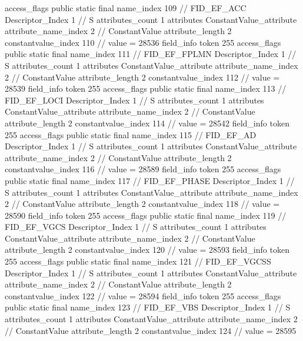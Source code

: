 {{{{{				access_flags	public static final
				name_index	109		// FID_EF_ACC
				Descriptor_Index	1		// S
				attributes_count	1
				attributes {
				ConstantValue_attribute {
					attribute_name_index	2		// ConstantValue
					attribute_length	2
					constantvalue_index	110		// value = 28536
				}
				}
			}
			field_info {
				token	255
				access_flags	public static final
				name_index	111		// FID_EF_FPLMN
				Descriptor_Index	1		// S
				attributes_count	1
				attributes {
				ConstantValue_attribute {
					attribute_name_index	2		// ConstantValue
					attribute_length	2
					constantvalue_index	112		// value = 28539
				}
				}
			}
			field_info {
				token	255
				access_flags	public static final
				name_index	113		// FID_EF_LOCI
				Descriptor_Index	1		// S
				attributes_count	1
				attributes {
				ConstantValue_attribute {
					attribute_name_index	2		// ConstantValue
					attribute_length	2
					constantvalue_index	114		// value = 28542
				}
				}
			}
			field_info {
				token	255
				access_flags	public static final
				name_index	115		// FID_EF_AD
				Descriptor_Index	1		// S
				attributes_count	1
				attributes {
				ConstantValue_attribute {
					attribute_name_index	2		// ConstantValue
					attribute_length	2
					constantvalue_index	116		// value = 28589
				}
				}
			}
			field_info {
				token	255
				access_flags	public static final
				name_index	117		// FID_EF_PHASE
				Descriptor_Index	1		// S
				attributes_count	1
				attributes {
				ConstantValue_attribute {
					attribute_name_index	2		// ConstantValue
					attribute_length	2
					constantvalue_index	118		// value = 28590
				}
				}
			}
			field_info {
				token	255
				access_flags	public static final
				name_index	119		// FID_EF_VGCS
				Descriptor_Index	1		// S
				attributes_count	1
				attributes {
				ConstantValue_attribute {
					attribute_name_index	2		// ConstantValue
					attribute_length	2
					constantvalue_index	120		// value = 28593
				}
				}
			}
			field_info {
				token	255
				access_flags	public static final
				name_index	121		// FID_EF_VGCSS
				Descriptor_Index	1		// S
				attributes_count	1
				attributes {
				ConstantValue_attribute {
					attribute_name_index	2		// ConstantValue
					attribute_length	2
					constantvalue_index	122		// value = 28594
				}
				}
			}
			field_info {
				token	255
				access_flags	public static final
				name_index	123		// FID_EF_VBS
				Descriptor_Index	1		// S
				attributes_count	1
				attributes {
				ConstantValue_attribute {
					attribute_name_index	2		// ConstantValue
					attribute_length	2
					constantvalue_index	124		// value = 28595
}}}}}}}

